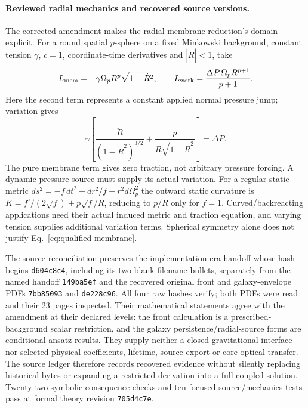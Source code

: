 \paragraph{Reviewed radial mechanics and recovered source versions.}
The corrected amendment \cite{CarberryCoreSurface2026} makes the radial
membrane reduction's domain explicit. For a round spatial $p$-sphere on
a fixed Minkowski background, constant tension $\gamma$, $c=1$,
coordinate-time derivatives and $|\dot R|<1$, take
\begin{equation}
 L_{\rm mem}=-\gamma\Omega_pR^p\sqrt{1-\dot R^2},\qquad
 L_{\rm work}=\frac{\Delta P\,\Omega_pR^{p+1}}{p+1}.
\end{equation}
Here the second term represents a constant applied normal pressure jump;
variation gives
\begin{equation}
 \gamma\left[\frac{\ddot R}{(1-\dot R^2)^{3/2}}
       +\frac{p}{R\sqrt{1-\dot R^2}}\right]=\Delta P.
 \label{eq:qualified-membrane}
\end{equation}
The pure membrane term gives zero traction, not arbitrary pressure
forcing. A dynamic pressure source must supply its actual variation.
For a regular static metric
$ds^2=-f\,dt^2+dr^2/f+r^2d\Omega_p^2$ the outward static curvature is
$K=f'/(2\sqrt f)+p\sqrt f/R$, reducing to $p/R$ only for $f=1$.
Curved/backreacting applications need their actual induced metric and
traction equation, and varying tension supplies additional variation
terms. Spherical symmetry alone does not justify
Eq.~\eqref{eq:qualified-membrane}.

The source reconciliation preserves the implementation-era handoff
whose hash begins \texttt{d604c8c4}, including its two blank filename
bullets, separately from the named handoff \texttt{149ba5ef} and the
recovered original front and galaxy-envelope PDFs
\texttt{7bb85093} and \texttt{de228c96}. All four raw hashes verify;
both PDFs were read and their 23 pages inspected. Their mathematical
statements agree with the amendment at their declared levels: the front
calculation is a prescribed-background scalar restriction, and the
galaxy persistence/radial-source forms are conditional ansatz results.
They supply neither a closed gravitational interface nor selected
physical coefficients, lifetime, source export or core optical transfer.
The source ledger therefore records recovered evidence without silently
replacing historical bytes or expanding a restricted derivation into a
full coupled solution. Twenty-two symbolic consequence checks and ten
focused source/mechanics tests pass at formal theory revision
\texttt{705d4c7e}.

